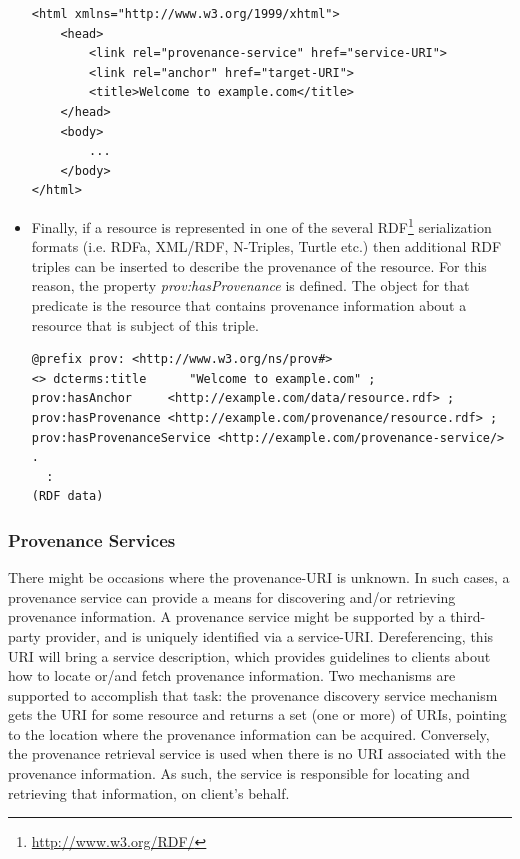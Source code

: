 \begin{itemize}
\begin{verbatim}
<html xmlns="http://www.w3.org/1999/xhtml">
    <head>
        <link rel="provenance-service" href="service-URI">
        <link rel="anchor" href="target-URI">
        <title>Welcome to example.com</title>
    </head>
    <body>
        ...
    </body>
</html>
\end{verbatim}
  \item
        Finally, if a resource is represented in one of the several RDF\footnote{\url{http://www.w3.org/RDF/}} serialization formats (i.e. RDFa, XML/RDF, N-Triples, Turtle etc.) then additional RDF triples can be inserted to describe the provenance of the resource. For this reason, the property \emph{prov:hasProvenance} is defined. The object for that predicate is the resource that contains provenance information about a resource that is subject of this triple.

\begin{verbatim}
@prefix prov: <http://www.w3.org/ns/prov#>
<> dcterms:title      "Welcome to example.com" ;
prov:hasAnchor     <http://example.com/data/resource.rdf> ;
prov:hasProvenance <http://example.com/provenance/resource.rdf> ;
prov:hasProvenanceService <http://example.com/provenance-service/> .
  :
(RDF data)
\end{verbatim}

\end{itemize}

\subsubsection{Provenance Services}

There might be occasions where the provenance-URI is unknown. In such cases, a provenance service can provide a means for discovering and/or retrieving provenance information. A provenance service might be supported by a third-party provider, and is uniquely identified via a service-URI. Dereferencing, this URI will bring a service description, which provides guidelines to clients about how to locate or/and fetch provenance information. Two mechanisms are supported to accomplish that task: the provenance discovery service mechanism gets the URI for some resource and returns a set (one or more) of URIs, pointing to the location where the provenance information can be acquired. Conversely, the provenance retrieval service is used when there is no URI associated with the provenance information. As such, the service is responsible for locating and retrieving that information, on client's behalf.

